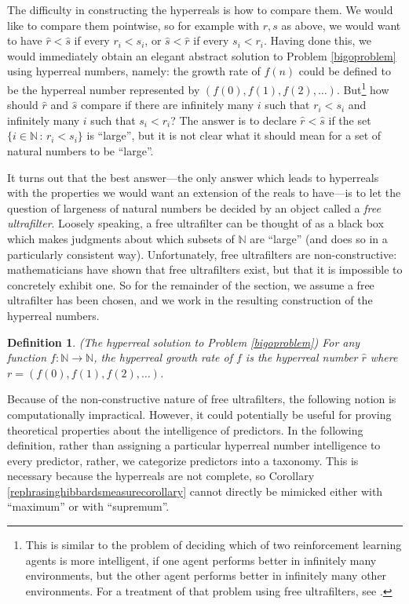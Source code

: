 \documentclass{article}
\newtheorem{definition}[theorem]{Definition}
\begin{document}
The difficulty in constructing the hyperreals is how to compare them.
We would like to compare them pointwise, so for example
with $r,s$ as above, we would want to have $\hat r<\hat s$ if
every $r_i<s_i$, or $\hat s<\hat r$ if every $s_i<r_i$.
Having done this, we would immediately obtain an elegant abstract
solution to Problem \ref{bigoproblem} using hyperreal numbers,
namely: the growth rate of $f(n)$ could be defined to be the
hyperreal number represented by $(f(0),f(1),f(2),\ldots)$.
But\footnote{This is similar to the problem of deciding which
of two reinforcement learning agents is more intelligent, if one agent
performs better in infinitely many environments, but the other agent performs
better in infinitely many other environments. For a treatment of that problem
using free ultrafilters, see \cite{alexander2019intelligence}.}
how should $\hat r$ and $\hat s$ compare if there are infinitely
many $i$ such that $r_i<s_i$ and infinitely many $i$ such that
$s_i<r_i$? The answer is to declare $\hat r<\hat s$ if the set
$\{i\in\mathbb N\,:\,r_i<s_i\}$ is ``large'', but it is not clear
what it should mean for a set of natural numbers to be ``large''.

It turns out that the best answer---the only answer which leads to
hyperreals with the properties we would want an extension of the
reals to have---is to let the question of largeness of natural numbers
be decided by an object called a \emph{free ultrafilter}.
Loosely speaking, a free ultrafilter can be thought
of as a black box which makes judgments about which subsets of $\mathbb N$
are ``large'' (and does so in a particularly consistent way).
Unfortunately, free ultrafilters are non-constructive: mathematicians have
shown that free ultrafilters
exist, but that it is impossible to concretely exhibit one.
So for the remainder of the section, we assume a free ultrafilter has been
chosen, and we work in the resulting construction of the hyperreal numbers.

\begin{definition}
\label{hyperrealgrowthratedefn}
    (The hyperreal solution to Problem \ref{bigoproblem})
    For any function $f:\mathbb N\to\mathbb N$, the \emph{hyperreal growth rate
    of $f$} is the hyperreal number $\hat r$
    where $r=(f(0),f(1),f(2),\ldots)$.
\end{definition}

Because of the non-constructive nature of free ultrafilters, the following notion
is computationally impractical. However, it could potentially be useful for
proving theoretical properties about the intelligence of predictors. In the following
definition, rather than assigning a particular hyperreal number intelligence to every
predictor, rather, we categorize predictors into a taxonomy. This is necessary because
the hyperreals are not complete, so Corollary \ref{rephrasinghibbardsmeasurecorollary}
cannot directly be mimicked either with ``maximum'' or with ``supremum''.
\end{document}
